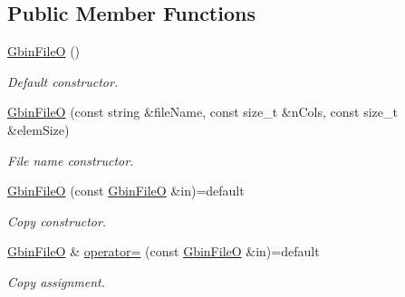 \subsection*{Public Member Functions}
\begin{DoxyCompactItemize}
\item 
\mbox{\label{classsamp_files_1_1_gbin_file_o_a4decba138fcab28c38f3bc342a82391c}} 
\hyperlink{classsamp_files_1_1_gbin_file_o_a4decba138fcab28c38f3bc342a82391c}{Gbin\+FileO} ()
\begin{DoxyCompactList}\small\item\em Default constructor. \end{DoxyCompactList}\item 
\hyperlink{classsamp_files_1_1_gbin_file_o_a3e3315ac7b1fe5e3a8f78f06e551e855}{Gbin\+FileO} (const string \&file\+Name, const size\+\_\+t \&n\+Cols, const size\+\_\+t \&elem\+Size)
\begin{DoxyCompactList}\small\item\em File name constructor. \end{DoxyCompactList}\item 
\mbox{\label{classsamp_files_1_1_gbin_file_o_aeaa76ff0be865d323a8f270866f854ad}} 
\hyperlink{classsamp_files_1_1_gbin_file_o_aeaa76ff0be865d323a8f270866f854ad}{Gbin\+FileO} (const \hyperlink{classsamp_files_1_1_gbin_file_o}{Gbin\+FileO} \&in)=default
\begin{DoxyCompactList}\small\item\em Copy constructor. \end{DoxyCompactList}\item 
\mbox{\label{classsamp_files_1_1_gbin_file_o_a9ea3272eb7905b981d80c71d6c8c057c}} 
\hyperlink{classsamp_files_1_1_gbin_file_o}{Gbin\+FileO} \& \hyperlink{classsamp_files_1_1_gbin_file_o_a9ea3272eb7905b981d80c71d6c8c057c}{operator=} (const \hyperlink{classsamp_files_1_1_gbin_file_o}{Gbin\+FileO} \&in)=default
\begin{DoxyCompactList}\small\item\em Copy assignment. \end{DoxyCompactList}\item 
\mbox{\label{classsamp_files_1_1_gbin_file_o_a01ffd02d1ed7fd456bf3168e26f7ba3f}} 

\end{DoxyCompactItemize}
